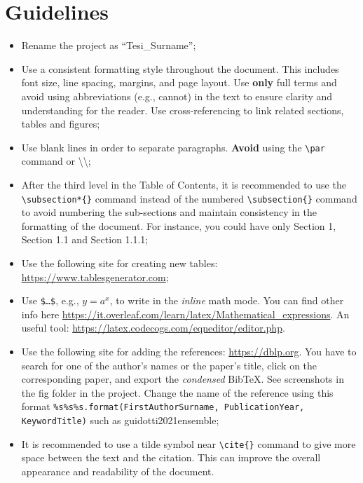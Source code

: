 \documentclass[11pt]{report} %
\newcommand{\quotes}[1]{``#1''}
\begin{document}

\begin{abstract}

\end{abstract}
\tableofcontents

\chapter{Guidelines}

\begin{itemize}
    \item Rename the project as \quotes{Tesi\_Surname};
    \item Use a consistent formatting style throughout the document. This
          includes font size, line spacing, margins, and page layout. Use
          \textbf{only} full terms and avoid using abbreviations (e.g., cannot)
          in the text to ensure clarity and understanding for the reader. Use
          cross-referencing to link related sections, tables and figures;
    \item Use blank lines in order to separate paragraphs. \textbf{Avoid} using
          the \texttt{\textbackslash par} command or \textbackslash\textbackslash;
    \item After the third level in the Table of Contents, it is recommended to
          use the \texttt{\textbackslash subsection*\{\}} command instead of
          the numbered \texttt{\textbackslash subsection\{\}} command to avoid
          numbering the sub-sections and maintain consistency in the formatting
          of the document. For instance, you could have only Section 1, Section
          1.1 and Section 1.1.1;
    \item Use the following site for creating new tables:
          \url{https://www.tablesgenerator.com};
    \item Use \texttt{\$\dots\$}, e.g., $y = a^x$, to write in the
          \textit{inline} math mode. You can find other info here
          \url{https://it.overleaf.com/learn/latex/Mathematical_expressions}.
          An useful tool: \url{https://latex.codecogs.com/eqneditor/editor.php}.
    \item Use the following site for adding the references:
          \url{https://dblp.org}. You have to search for one of the author's
          names or the paper's title, click on the corresponding paper, and
          export the \textit{condensed} BibTeX. See screenshots in the fig
          folder in the project. Change the name of the reference using this
          format \texttt{\%s\%s\%s.format(FirstAuthorSurname, PublicationYear,
              KeywordTitle)} such as guidotti2021ensemble;
    \item It is recommended to use a tilde symbol near \texttt{\textbackslash cite\{\}} command to give more space between the text and the citation. This can improve the overall appearance and readability of the document.

\end{itemize}
\end{document}
